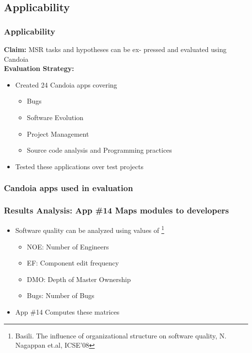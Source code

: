     \subsection{Applicability}
        \begin{frame}
            \frametitle{Applicability}
                \textbf{Claim:} MSR tasks and hypotheses can be ex- pressed and evaluated using Candoia \\
             \textbf{Evaluation Strategy:}
            \begin{itemize}
                \item Created 24 Candoia apps covering
                \begin{itemize}
                    \item Bugs
                    \item Software Evolution
                    \item Project Management
                    \item Source code analysis and Programming practices
                \end{itemize}
                \item Tested these applications over test projects
            \end{itemize}
         \end{frame}

        \begin{frame}
            \frametitle{Candoia apps used in evaluation}
            
         \end{frame}

%            

        \begin{frame}
            \frametitle{Results Analysis: App \#14 Maps modules to developers}
                \begin{itemize}
                    \item Software quality can be analyzed using values of \footnote{ \tiny{Basili. The
                    influence of organizational structure on software quality, N. Nagappan et.al, ICSE'08}}
                    \begin{itemize}
                        \item NOE: Number of Engineers
                        \item EF: Component edit frequency
                        \item DMO: Depth of Master Ownership
                        \item Bugs: Number of Bugs
                    \end{itemize}
                    \item App \#14 Computes these matrices
                \end{itemize}
        \end{frame}

